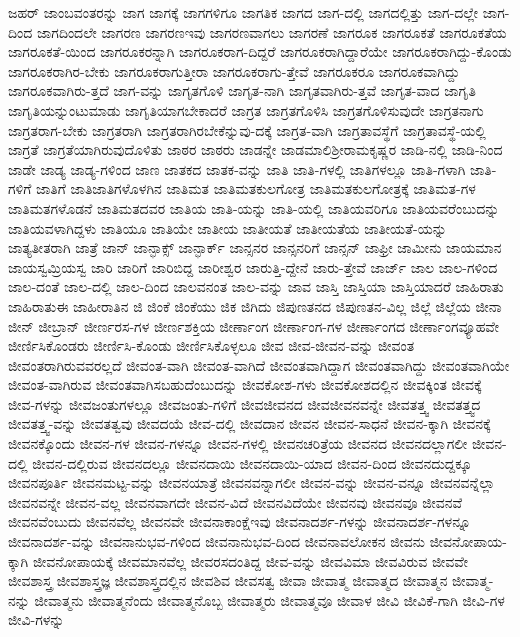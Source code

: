 {ಜಹರ್
ಜಾಂಬವಂತರನ್ನು
ಜಾಗ
ಜಾಗಕ್ಕೆ
ಜಾಗಗಳಿಗೂ
ಜಾಗತಿಕ
ಜಾಗದ
ಜಾಗ-ದಲ್ಲಿ
ಜಾಗದಲ್ಲಿತ್ತು
ಜಾಗ-ದಲ್ಲೇ
ಜಾಗ-ದಿಂದ
ಜಾಗದಿಂದಲೇ
ಜಾಗರಣ
ಜಾಗರಣಇವು
ಜಾಗರಣವಾಗಲು
ಜಾಗರಣೆ
ಜಾಗರೂಕ
ಜಾಗರೂಕತೆ
ಜಾಗರೂಕತೆಯ
ಜಾಗರೂಕತೆ-ಯಿಂದ
ಜಾಗರೂಕರನ್ನಾಗಿ
ಜಾಗರೂಕರಾಗ-ದಿದ್ದರೆ
ಜಾಗರೂಕರಾಗಿದ್ದಾರೆಯೇ
ಜಾಗರೂಕರಾಗಿದ್ದು-ಕೊಂಡು
ಜಾಗರೂಕರಾಗಿರ-ಬೇಕು
ಜಾಗರೂಕರಾಗುತ್ತೀರಾ
ಜಾಗರೂಕರಾಗು-ತ್ತೇವೆ
ಜಾಗರೂಕರೂ
ಜಾಗರೂಕವಾಗಿದ್ದು
ಜಾಗರೂಕವಾಗಿರು-ತ್ತದೆ
ಜಾಗ-ವನ್ನು
ಜಾಗೃತಗೊಳಿ
ಜಾಗೃತ-ನಾಗಿ
ಜಾಗೃತವಾಗಿರು-ತ್ತವೆ
ಜಾಗೃತ-ವಾದ
ಜಾಗೃತಿ
ಜಾಗೃತಿಯನ್ನುಂಟುಮಾಡು
ಜಾಗೃತಿಯಾಗಬೇಕಾದರೆ
ಜಾಗ್ರತ
ಜಾಗ್ರತಗೊಳಿಸಿ
ಜಾಗ್ರತಗೊಳಿಸುವುದೇ
ಜಾಗ್ರತನಾಗು
ಜಾಗ್ರತರಾಗ-ಬೇಕು
ಜಾಗ್ರತರಾಗಿ
ಜಾಗ್ರತರಾಗಿರಬೇಕೆನ್ನುವು-ದಕ್ಕೆ
ಜಾಗ್ರತ-ವಾಗಿ
ಜಾಗ್ರತಾವಸ್ಥೆಗೆ
ಜಾಗ್ರತಾವಸ್ಥೆ-ಯಲ್ಲಿ
ಜಾಗ್ರತೆ
ಜಾಗ್ರತೆಯಾಗಿರುವುದೊಳಿತು
ಜಾಠರ
ಜಾಠರು
ಜಾಡನ್ನೇ
ಜಾಡಮಾಲಿಶ್ರೀರಾಮಕೃಷ್ಣರ
ಜಾಡಿ-ನಲ್ಲಿ
ಜಾಡಿ-ನಿಂದ
ಜಾಡೇ
ಜಾಡ್ಯ
ಜಾಡ್ಯ-ಗಳಿಂದ
ಜಾಣ
ಜಾತಕದ
ಜಾತಕ-ವನ್ನು
ಜಾತಿ
ಜಾತಿ-ಗಳಲ್ಲಿ
ಜಾತಿಗಳಲ್ಲೂ
ಜಾತಿ-ಗಳಾಗಿ
ಜಾತಿ-ಗಳಿಗೆ
ಜಾತಿಗೆ
ಜಾತಿಜಾತಿಗಳೊಳಗಿನ
ಜಾತಿಮತ
ಜಾತಿಮತಕುಲಗೋತ್ರ
ಜಾತಿಮತಕುಲಗೋತ್ರಕ್ಕೆ
ಜಾತಿಮತ-ಗಳ
ಜಾತಿಮತಗಳೊಡನೆ
ಜಾತಿಮತದವರ
ಜಾತಿಯ
ಜಾತಿ-ಯನ್ನು
ಜಾತಿ-ಯಲ್ಲಿ
ಜಾತಿಯವರಿಗೂ
ಜಾತಿಯವರೆಂಬುದನ್ನು
ಜಾತಿಯವಳಾಗಿದ್ದಳು
ಜಾತಿಯೂ
ಜಾತಿಯೇ
ಜಾತೀಯ
ಜಾತೀಯತೆ
ಜಾತೀಯತೆಯ
ಜಾತೀಯತೆ-ಯನ್ನು
ಜಾತ್ಯತೀತರಾಗಿ
ಜಾತ್ರೆ
ಜಾನ್
ಜಾನ್ಫಾಕ್ಸ್
ಜಾನ್ಫಾರ್ಕ್
ಜಾನ್ಸನರ
ಜಾನ್ಸನರಿಗೆ
ಜಾನ್ಸನ್
ಜಾಫ್ರೀ
ಜಾಮೀನು
ಜಾಯಮಾನ
ಜಾಯಸ್ವಮ್ರಿಯಸ್ವ
ಜಾರಿ
ಜಾರಿಗೆ
ಜಾರಿಬಿದ್ದ
ಜಾರೀಶ್ವರ
ಜಾರುತ್ತಿ-ದ್ದೇನೆ
ಜಾರು-ತ್ತೇವೆ
ಜಾರ್ಜ್
ಜಾಲ
ಜಾಲ-ಗಳಿಂದ
ಜಾಲ-ದಂತೆ
ಜಾಲ-ದಲ್ಲಿ
ಜಾಲ-ದಿಂದ
ಜಾಲವನಂತ
ಜಾಲ-ವನ್ನು
ಜಾವ
ಜಾಸ್ತಿ
ಜಾಸ್ತಿಯಾ
ಜಾಸ್ತಿಯಾದರೆ
ಜಾಹಿರಾತು
ಜಾಹಿರಾತುಈ
ಜಾಹೀರಾತಿನ
ಜಿ
ಜಿಂಕೆ
ಜಿಂಕೆಯು
ಜಿಕ
ಜಿಗಿದು
ಜಿಪುಣತನದ
ಜಿಪುಣತನ-ವಿಲ್ಲ
ಜಿಲ್ಲೆ
ಜಿಲ್ಲೆಯ
ಜೀನಾ
ಜೀನ್
ಜೀಬ್ರಾನ್
ಜೀರ್ಣರಸ-ಗಳ
ಜೀರ್ಣಶಕ್ತಿಯ
ಜೀರ್ಣಾಂಗ
ಜೀರ್ಣಾಂಗ-ಗಳ
ಜೀರ್ಣಾಂಗದ
ಜೀರ್ಣಾಂಗವ್ಯೂಹವೇ
ಜೀರ್ಣಿಸಿಕೊಂಡರು
ಜೀರ್ಣಿಸಿ-ಕೊಂಡು
ಜೀರ್ಣಿಸಿಕೊಳ್ಳಲೂ
ಜೀವ
ಜೀವ-ಜೀವನ-ವನ್ನು
ಜೀವಂತ
ಜೀವಂತರಾಗಿರುವವರಲ್ಲದೆ
ಜೀವಂತ-ವಾಗಿ
ಜೀವಂತ-ವಾಗಿದೆ
ಜೀವಂತವಾಗಿದ್ದಾಗ
ಜೀವಂತವಾಗಿದ್ದು
ಜೀವಂತವಾಗಿಯೇ
ಜೀವಂತ-ವಾಗಿರುವ
ಜೀವಂತವಾಗಿಸಬಹುದೆಂಬುದನ್ನು
ಜೀವಕೋಶ-ಗಳು
ಜೀವಕೋಶದಲ್ಲಿನ
ಜೀವಕ್ಕಿಂತ
ಜೀವಕ್ಕೆ
ಜೀವ-ಗಳನ್ನು
ಜೀವಜಂತುಗಳಲ್ಲೂ
ಜೀವಜಂತು-ಗಳಿಗೆ
ಜೀವಜೀವನದ
ಜೀವಜೀವನವನ್ನೇ
ಜೀವತತ್ತ್ವ
ಜೀವತತ್ತ್ವದ
ಜೀವತತ್ತ್ವ-ವನ್ನು
ಜೀವತತ್ವವು
ಜೀವದಯೆ
ಜೀವ-ದಲ್ಲಿ
ಜೀವದಾನ
ಜೀವನ
ಜೀವನ-ಸಾಧನೆ
ಜೀವನ-ಕ್ಕಾಗಿ
ಜೀವನಕ್ಕೆ
ಜೀವನಕ್ಕೊಂದು
ಜೀವನ-ಗಳ
ಜೀವನ-ಗಳನ್ನೂ
ಜೀವನ-ಗಳಲ್ಲಿ
ಜೀವನಚರಿತ್ರೆಯ
ಜೀವನದ
ಜೀವನದಲ್ಲಾಗಲೀ
ಜೀವನ-ದಲ್ಲಿ
ಜೀವನ-ದಲ್ಲಿರುವ
ಜೀವನದಲ್ಲೂ
ಜೀವನದಾಯಿ
ಜೀವನದಾಯಿ-ಯಾದ
ಜೀವನ-ದಿಂದ
ಜೀವನದುದ್ದಕ್ಕೂ
ಜೀವನಪೂರ್ತಿ
ಜೀವನಮಟ್ಟ-ವನ್ನು
ಜೀವನಯಾತ್ರೆ
ಜೀವನವನ್ನಾಗಲೀ
ಜೀವನ-ವನ್ನು
ಜೀವನ-ವನ್ನೂ
ಜೀವನವನ್ನೆಲ್ಲಾ
ಜೀವನವನ್ನೇ
ಜೀವನ-ವಲ್ಲ
ಜೀವನವಾಗದೇ
ಜೀವನ-ವಿದೆ
ಜೀವನವಿದೆಯೇ
ಜೀವನವು
ಜೀವನವೂ
ಜೀವನವೆ
ಜೀವನವೆಂಬುದು
ಜೀವನವೆಲ್ಲ
ಜೀವನವೇ
ಜೀವನಾಕಾಂಕ್ಷೆಇವು
ಜೀವನಾದರ್ಶ-ಗಳನ್ನು
ಜೀವನಾದರ್ಶ-ಗಳನ್ನೂ
ಜೀವನಾದರ್ಶ-ವನ್ನು
ಜೀವನಾನುಭವ-ಗಳಿಂದ
ಜೀವನಾನುಭವ-ದಿಂದ
ಜೀವನಾವಲೋಕನ
ಜೀವನು
ಜೀವನೋಪಾಯ-ಕ್ಕಾಗಿ
ಜೀವನೋಪಾಯಕ್ಕೆ
ಜೀವಮಾನವೆಲ್ಲ
ಜೀವರಸದಂತಿದ್ದ
ಜೀವ-ವನ್ನು
ಜೀವವಿಮಾ
ಜೀವವಿರುವ
ಜೀವವೇ
ಜೀವಶಾಸ್ತ್ರ
ಜೀವಶಾಸ್ತ್ರಜ್ಞ
ಜೀವಶಾಸ್ತ್ರದಲ್ಲಿನ
ಜೀವಶಿವ
ಜೀವಸತ್ವ
ಜೀವಾ
ಜೀವಾತ್ಮ
ಜೀವಾತ್ಮದ
ಜೀವಾತ್ಮನ
ಜೀವಾತ್ಮ-ನನ್ನು
ಜೀವಾತ್ಮನು
ಜೀವಾತ್ಮನೆಂದು
ಜೀವಾತ್ಮನೊಬ್ಬ
ಜೀವಾತ್ಮರು
ಜೀವಾತ್ಮವೂ
ಜೀವಾಳ
ಜೀವಿ
ಜೀವಿಕೆ-ಗಾಗಿ
ಜೀವಿ-ಗಳ
ಜೀವಿ-ಗಳನ್ನು
}
